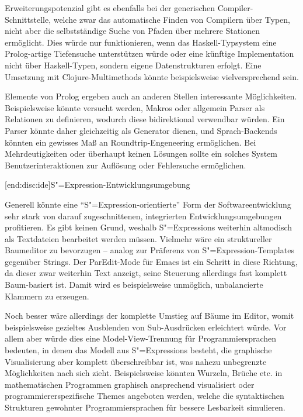 \documentclass[12pt, a4paper, bibgerm]{scrbook}
\newcommand\lsubsection{}
\newcommand{\sexp}{S"=Expression}
\newcommand{\sexps}{S"=Expressions}
\begin{document}
Erweiterungspotenzial gibt es ebenfalls bei der generischen
Compiler-Schnittstelle, welche zwar das automatische Finden von
Compilern über Typen, nicht aber die selbstständige Suche von Pfaden
über mehrere Stationen ermöglicht. Dies würde nur funktionieren, wenn
das Haskell-Typsystem eine Prolog-artige Tiefensuche \cite{Prolog}
unterstützen würde oder eine künftige Implementation nicht über
Haskell-Typen, sondern eigene Datenstrukturen erfolgt. Eine Umsetzung
mit Clojure-Multimethods \cite[S. 246ff]{Clojure} könnte beispielsweise
vielversprechend sein.

Elemente von Prolog ergeben auch an anderen Stellen interessante
Möglichkeiten. Beispielsweise könnte versucht werden, Makros oder
allgemein Parser als Relationen zu definieren, wodurch diese
bidirektional verwendbar würden. Ein Parser könnte daher gleichzeitig
als Generator dienen, und Sprach-Backends könnten ein gewisses Maß an
Roundtrip-Engeneering \cite{Roundtrip} ermöglichen. Bei Mehrdeutigkeiten
oder überhaupt keinen Lösungen sollte ein solches System
Benutzerinteraktionen zur Auflösung oder Fehlersuche ermöglichen.

\lsubsection[end:disc:ide]{\sexp{}-Entwicklungsumgebung}

Generell könnte eine ``\sexp{}-orientierte'' Form der
Softwareentwicklung sehr stark von darauf zugeschnittenen, integrierten
Entwicklungsumgebungen profitieren. Es gibt keinen Grund, weshalb
\sexps{} weiterhin altmodisch als Textdateien bearbeitet werden
müssen. Vielmehr wäre ein struktureller Baumeditor zu bevorzugen --
analog zur Präferenz von \sexp{}-Templates gegenüber Strings. Der
ParEdit-Mode \cite{Paredit} für Emacs \cite{Emacs} ist ein Schritt in
diese Richtung, da dieser zwar weiterhin Text anzeigt, seine Steuerung
allerdings fast komplett Baum-basiert ist. Damit wird es beispielsweise
unmöglich, unbalancierte Klammern zu erzeugen.

Noch besser wäre allerdings der komplette Umstieg auf Bäume im Editor,
womit beispielsweise gezieltes Ausblenden von Sub-Ausdrücken erleichtert
würde. Vor allem aber würde dies eine Model-View-Trennung für
Programmiersprachen bedeuten, in denen das Modell aus \sexps{} besteht,
die graphische Visualisierung aber komplett überschreibbar ist, was
nahezu unbegrenzte Möglichkeiten nach sich zieht. Beispielsweise könnten
Wurzeln, Brüche etc. in mathematischen Programmen graphisch ansprechend
visualisiert oder programmiererspezifische Themes angeboten werden,
welche die syntaktischen Strukturen gewohnter Programmiersprachen für
bessere Lesbarkeit simulieren.
\end{document}
